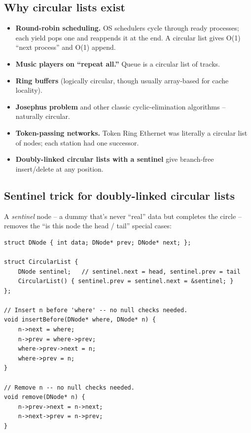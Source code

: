 \documentclass[11pt]{article}
\begin{document}
\subsection*{Why circular lists exist}

\begin{itemize}[leftmargin=*]
    \item \textbf{Round-robin scheduling.} OS schedulers cycle through ready processes; each yield pops one and reappends it at the end. A circular list gives O(1) ``next process'' and O(1) append.
    \item \textbf{Music players on ``repeat all.''} Queue is a circular list of tracks.
    \item \textbf{Ring buffers} (logically circular, though usually array-based for cache locality).
    \item \textbf{Josephus problem} and other classic cyclic-elimination algorithms -- naturally circular.
    \item \textbf{Token-passing networks.} Token Ring Ethernet was literally a circular list of nodes; each station had one successor.
    \item \textbf{Doubly-linked circular lists with a sentinel} give branch-free insert/delete at any position.
\end{itemize}

\subsection*{Sentinel trick for doubly-linked circular lists}

A \emph{sentinel} node -- a dummy that's never ``real'' data but completes the circle -- removes the ``is this node the head / tail'' special cases:

\begin{lstlisting}[basicstyle=\ttfamily\small,frame=single]
struct DNode { int data; DNode* prev; DNode* next; };

struct CircularList {
    DNode sentinel;   // sentinel.next = head, sentinel.prev = tail
    CircularList() { sentinel.prev = sentinel.next = &sentinel; }
};

// Insert n before 'where' -- no null checks needed.
void insertBefore(DNode* where, DNode* n) {
    n->next = where;
    n->prev = where->prev;
    where->prev->next = n;
    where->prev = n;
}

// Remove n -- no null checks needed.
void remove(DNode* n) {
    n->prev->next = n->next;
    n->next->prev = n->prev;
}
\end{lstlisting}
\end{document}
